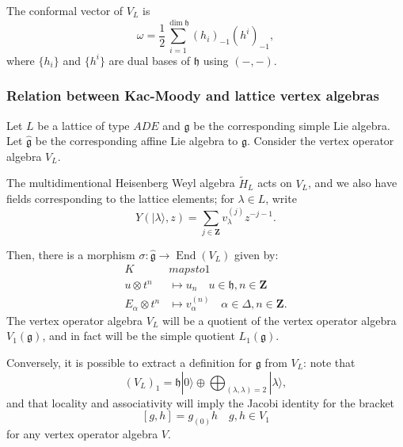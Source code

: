 \documentclass{article}
\newcommand{\ZZ}{\mathbold{Z}}
\newcommand{\vac}{|0\rangle}
\newcommand{\gf}{\mathfrak{g}}
\newcommand{\hh}{\mathfrak{h}}
\newcommand{\ghat}{\widehat{\mathfrak{g}}}
\DeclareMathOperator{\End}{End}
\begin{document}
The conformal vector of $V_L$ is
\[\omega=\frac{1}{2} \sum_{i=1}^{\dim \hh}(h_i)_{-1}(h^i)_{-1}, \]
where $\{h_i\}$ and $\{h^i\}$ are dual bases of $\hh$ using $(-,-)$.
\subsubsection{Relation between Kac-Moody and lattice vertex algebras}
Let $L$ be a lattice of type $ADE$ and $\gf$ be the corresponding simple Lie algebra.  Let $\ghat$ be the corresponding affine Lie algebra to $\gf$.  Consider the vertex operator algebra $V_L$.

The multidimentional Heisenberg Weyl algebra $\widetilde{H}_L$ acts on $V_L$, and we also have fields corresponding to the lattice elements; for $\lambda \in L$, write
\[Y(|\lambda\rangle,z)=\sum_{j \in \ZZ}v^{(j)}_\lambda z^{-j-1}. \]

Then, there is a morphism $\sigma: \ghat \rightarrow \End(V_L)$ given by:
\begin{align}
  K &mapsto 1\\
  u \otimes t^n &\mapsto u_n \quad u \in \hh, n \in \ZZ\\
  E_\alpha \otimes t^n &\mapsto v^{(n)}_\alpha \quad \alpha \in \Delta, n \in \ZZ.
\end{align}
The vertex operator algebra $V_L$ will be a quotient of the vertex operator algebra $V_1(\gf)$, and in fact will be the simple quotient $L_1(\gf)$.

Conversely, it is possible to extract a definition for $\gf$ from $V_L$: note that
\[(V_L)_1 = \hh \vac \oplus \bigoplus_{(\lambda,\lambda)=2}|\lambda\rangle, \]
and that locality and associativity will imply the Jacobi identity for the bracket
\[[g,h]=g_{(0)}h \quad g,h \in V_1 \]
for any vertex operator algebra $V$.
\end{document}
